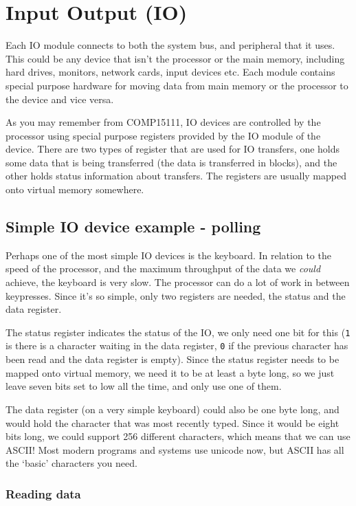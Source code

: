 \section{Input Output (IO)}

Each IO module connects to both the system bus, and peripheral that it uses.
This could be any device that isn't the processor or the main memory, including
hard drives, monitors, network cards, input devices etc. Each module contains
special purpose hardware for moving data from main memory or the processor to
the device and vice versa.

As you may remember from COMP15111, IO devices are controlled by the processor
using special purpose registers provided by the IO module of the device. There
are two types of register that are used for IO transfers, one holds some data
that is being transferred (the data is transferred in blocks), and the other
holds status information about transfers. The registers are usually mapped onto
virtual memory somewhere.

\subsection{Simple IO device example - polling}

Perhaps one of the most simple IO devices is the keyboard. In relation to the
speed of the processor, and the maximum throughput of the data we \textit{could}
achieve, the keyboard is very slow. The processor can do a lot of work in
between keypresses. Since it's so simple, only two registers are needed, the
status and the data register.

The status register indicates the status of the IO, we only need one bit for
this (\texttt{1} is there is a character waiting in the data register,
\texttt{0} if the previous character has been read and the data register is
empty). Since the status register needs to be mapped onto virtual memory, we
need it to be at least a byte long, so we just leave seven bits set to low all
the time, and only use one of them.

The data register (on a very simple keyboard) could also be one byte long, and
would hold the character that was most recently typed. Since it would be eight
bits long, we could support 256 different characters, which means that we can
use ASCII! Most modern programs and systems use unicode now, but ASCII has all
the `basic' characters you need.

\subsubsection{Reading data}

